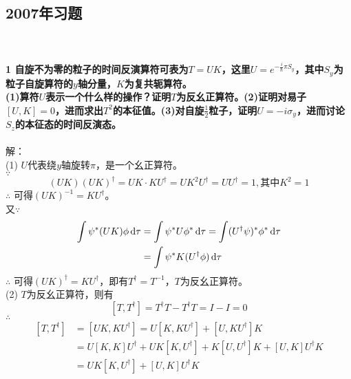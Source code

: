 \documentclass[12pt]{article}
\numberwithin{equation}{section}	 %
\begin{document}
\begin{spacing}{1.5}
\subsection{2007年习题}
~\\
~\\
\textbf{1 \quad 自旋不为零的粒子的时间反演算符可表为$T=UK$，这里$U=e^{-\frac{i}{\hbar}\pi S_{y}}$，其中$S_{y}$为粒子自旋算符的$y$轴分量，$K$为复共轭算符。\\
(1)算符$U$表示一个什么样的操作？证明$T$为反幺正算符。(2)证明对易子$[U,K]=0$，进而求出$T^{2}$的本征值。(3)对自旋$\displaystyle \frac{1}{2}$粒子，证明$U=-i\sigma_{y}$，进而讨论$S_{z}$的本征态的时间反演态。}\\
~\\
解：\\
(1) \quad 
$U$代表绕$y$轴旋转$\pi$，是一个幺正算符。\\
$\because$
\begin{equation}\nonumber 		%
(UK)(UK)^{\dagger} = UK \cdot KU^{\dagger} = UK^{2}U^{\dagger} = UU^{\dagger} = 1,\text{其中}K^{2}=1
\end{equation}
$\therefore$ 可得$(UK)^{-1} = KU^{\dagger}$。\\
又$\because$
\begin{equation}\nonumber 		%
\begin{aligned}
\int \psi^{*}(UK)\phi\dif\tau &= \int \psi^{*}U\phi^{*}\dif\tau = \int (U^{\dagger}\psi)^{*}\phi^{*}\dif\tau \\
&= \int \psi^{*}K(U^{\dagger}\phi)\dif\tau
\end{aligned}
\end{equation}
$\therefore$ 可得$(UK)^{\dagger} = KU^{\dagger}$，即有$T^{\dagger} = T^{-1}$，$T$为反幺正算符。\\
(2) \quad $T$为反幺正算符，则有\\
\begin{equation}
\left[T,T^{\dagger}\right] = T^{\dagger}T - T^{\dagger}T = I - I = 0
\end{equation}
$\therefore$
\begin{equation}
\begin{aligned}
\left[T,T^{\dagger}\right] &= \left[UK,KU^{\dagger}\right] = U\left[K,KU^{\dagger}\right] + \left[U,KU^{\dagger}\right]K\\
&= U\left[K,K\right]U^{\dagger} + UK\left[K,U^{\dagger}\right] + K\left[U,U^{\dagger}\right]K + \left[U,K\right]U^{\dagger}K \\
&= UK\left[K,U^{\dagger}\right] + \left[U,K\right]U^{\dagger}K \\

\end{aligned}
\end{equation}
\end{spacing}
\end{document}
